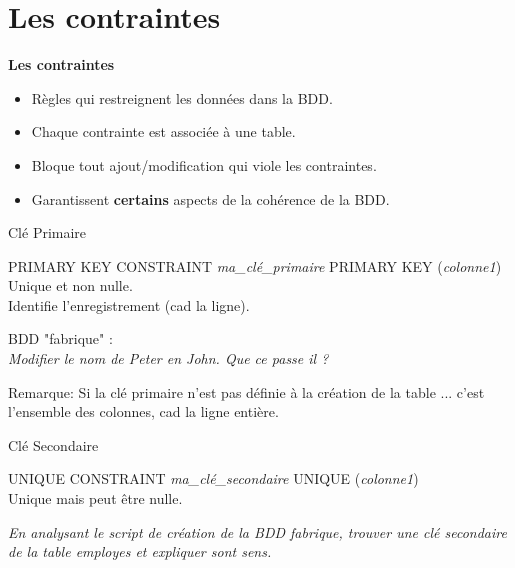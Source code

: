 \documentclass[xetex,dvipsnames]{beamer}
\begin{document}
 
\section{Les contraintes}
\begin{frame}
\begin{center}
{\LARGE \textbf{Les contraintes}}
\end{center}
\pause
\begin{itemize}
	\item Règles qui restreignent les données dans la BDD.\\
	\item Chaque contrainte est associée à une table.\\
	\item Bloque tout ajout/modification qui viole les contraintes.
	\item Garantissent \textbf{certains} aspects de la cohérence de la BDD.
\end{itemize}
\end{frame}

\begin{frame}{Clé Primaire}
	\begin{alertblock}{PRIMARY KEY}
		CONSTRAINT \textit{ma\_clé\_primaire} PRIMARY KEY (\textit{colonne1})\\
		Unique et non nulle.\\
		Identifie l'enregistrement (cad la ligne).\\
	\end{alertblock}
	
\begin{scriptsize}
	BDD "fabrique" :\\
	\textit{Modifier le nom de Peter en John. Que ce passe il ? }\\
\end{scriptsize}

	\vspace*{1em}
	Remarque: Si la clé primaire n'est pas définie à la création de la table ... \pause c'est l'ensemble des colonnes, cad la ligne entière.
	
	
\end{frame}

\begin{frame}{Clé Secondaire}
	\begin{alertblock}{UNIQUE}
		CONSTRAINT \textit{ma\_clé\_secondaire} UNIQUE (\textit{colonne1})\\
		Unique mais peut être nulle.
	\end{alertblock}
	
	\textit{En analysant le script de création de la BDD fabrique, trouver une clé secondaire de la table employes et expliquer sont sens.}\\
		
\end{frame}
\end{document}
